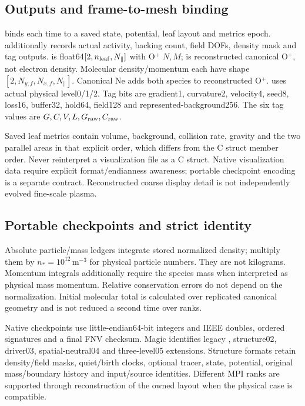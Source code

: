\subsection{Outputs and frame-to-mesh binding}
 binds each time to a saved state, potential, leaf layout
and metrics epoch.  additionally records actual
activity, backing count, field DOFs, density mask and tag outputs.
 is float64$[2,n_{\rm leaf},N_\parallel]$ with O$^+$ $N,M$;
 is reconstructed canonical O$^+$, not electron
density. Molecular density/momentum each have shape
$[2,N_{y,f},N_{x,f},N_\parallel]$. Canonical Ne adds both species to reconstructed
O$^+$.  uses actual physical level0/1/2. Tag bits are
gradient1, curvature2, velocity4, seed8, loss16, buffer32, hold64, field128
and represented-background256. The six tag values are $G,C,V,L,G_{\rm raw},
C_{\rm raw}$.

Saved leaf metrics contain volume, background, collision rate, gravity and
the two parallel areas in that explicit order, which differs from the C
struct member order. Never reinterpret a visualization file as a C struct.
Native visualization data require explicit format/endianness awareness;
portable checkpoint encoding is a separate contract. Reconstructed coarse
display detail is not independently evolved fine-scale plasma.

\subsection{Portable checkpoints and strict identity}
Absolute particle/mass ledgers integrate stored normalized density; multiply
them by $n_*=10^{12}\,\mathrm{m^{-3}}$ for physical particle numbers. They
are not kilograms. Momentum integrals additionally require the species mass
when interpreted as physical mass momentum. Relative conservation errors do
not depend on the normalization. Initial molecular total is calculated over
replicated canonical geometry and is not reduced a second time over ranks.

Native checkpoints use little-endian64-bit integers and IEEE doubles,
ordered signatures and a final FNV checksum. Magic identifies legacy
, structure02, driver03, spatial-neutral04 and three-level05
extensions. Structure formats retain density/field masks, quiet/birth
clocks, optional tracer, state, potential, original mass/boundary history
and input/source identities. Different MPI ranks are supported through
reconstruction of the owned layout when the physical case is compatible.

